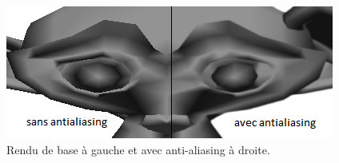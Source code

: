 \begin{figure}[h!]
	\centering
	\includegraphics[scale=0.7]{images/antialiasing.png}
	\caption{\label{fig:antialiasing.png} Rendu de base à gauche et avec anti-aliasing à droite. \protect}
\end{figure}

